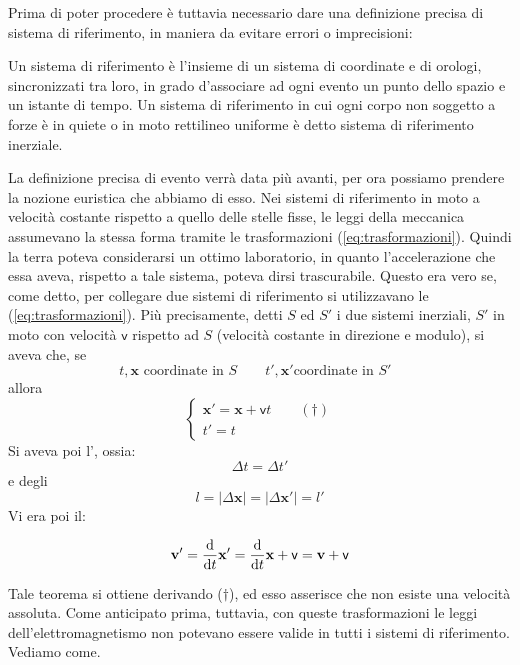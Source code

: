 Prima di poter procedere \`e tuttavia necessario dare
una definizione precisa di sistema di riferimento, in maniera da
evitare errori o imprecisioni:
\begin{definizione}
  Un sistema di riferimento \`e l'insieme di un sistema di coordinate
  e di orologi, sincronizzati tra loro, in grado d'associare ad ogni
  evento un punto dello spazio e un istante di tempo. Un sistema di
  riferimento in cui ogni corpo non soggetto a forze \`e in quiete o
  in moto rettilineo uniforme \`e detto sistema di riferimento inerziale.
\end{definizione}
La definizione precisa di evento verr\`a data pi\`u avanti, per ora
possiamo prendere la nozione euristica che abbiamo di esso. Nei sistemi
di riferimento in moto a velocit\`a costante rispetto a quello delle
stelle fisse, le leggi della meccanica assumevano la stessa forma
tramite le trasformazioni (\ref{eq:trasformazioni}). Quindi la terra
poteva considerarsi un ottimo laboratorio, in quanto
l'accelerazione che essa aveva, rispetto
a tale sistema, poteva dirsi trascurabile. Questo era vero se, come
detto, per collegare due sistemi di riferimento si utilizzavano le
(\ref{eq:trasformazioni}). Pi\`u
precisamente, detti $S$ ed $S'$ i due sistemi inerziali, $S'$ in moto
con velocit\`a $\mathsf{v}$ rispetto ad $S$ (velocit\`a costante in
direzione e modulo), si aveva che, se
\begin{displaymath}
  t,\mathbf{x} \mbox{ coordinate in $S$} \qquad t',\mathbf{x}' \mbox{
    coordinate in $S'$ }
\end{displaymath}
allora
\begin{equation}
  \left\{\begin{array}{l}
      \mathbf{x}'=\mathbf{x}+\mathbf{\mathsf{v}}t\qquad
      (\dagger)\\
      t'=t\end{array}\right. \label{eq:trasformazioni}
\end{equation}
 Si aveva poi l', ossia:
\begin{equation}
  \Delta t=\Delta t'\label{eq:invtempo}
\end{equation}
e degli 
\begin{equation}
  l = |\Delta\mathbf{x}| =
  |\Delta\mathbf{x}'|=l'\label{eq:invspazio}
\end{equation}  
Vi era poi il:
\begin{teorema}
  \begin{displaymath}
    \mathbf{v}'=\frac{\mathrm{d}}{\mathrm{d} t}\mathbf{x}'=\frac{\mathrm{d}}{\mathrm{d}
      t}\mathbf{x}+\mathbf{\mathsf{v}}=\mathbf{v}+\mathbf{\mathsf{v}}
  \end{displaymath}
\end{teorema}
Tale teorema si ottiene derivando ($\dagger$), ed esso asserisce che
non esiste una velocit\`a assoluta.  
%
\newline 
%
Come anticipato prima, tuttavia, con queste trasformazioni le leggi
dell'elettromagnetismo non potevano essere valide in tutti i sistemi di
riferimento. Vediamo come.
